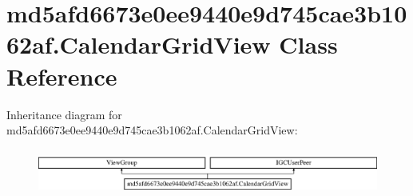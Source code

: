 \hypertarget{classmd5afd6673e0ee9440e9d745cae3b1062af_1_1CalendarGridView}{}\section{md5afd6673e0ee9440e9d745cae3b1062af.\+Calendar\+Grid\+View Class Reference}
\label{classmd5afd6673e0ee9440e9d745cae3b1062af_1_1CalendarGridView}
Inheritance diagram for md5afd6673e0ee9440e9d745cae3b1062af.\+Calendar\+Grid\+View\+:\begin{figure}[H]
\begin{center}
\leavevmode
\includegraphics[height=1.517615cm]{classmd5afd6673e0ee9440e9d745cae3b1062af_1_1CalendarGridView}
\end{center}
\end{figure}
